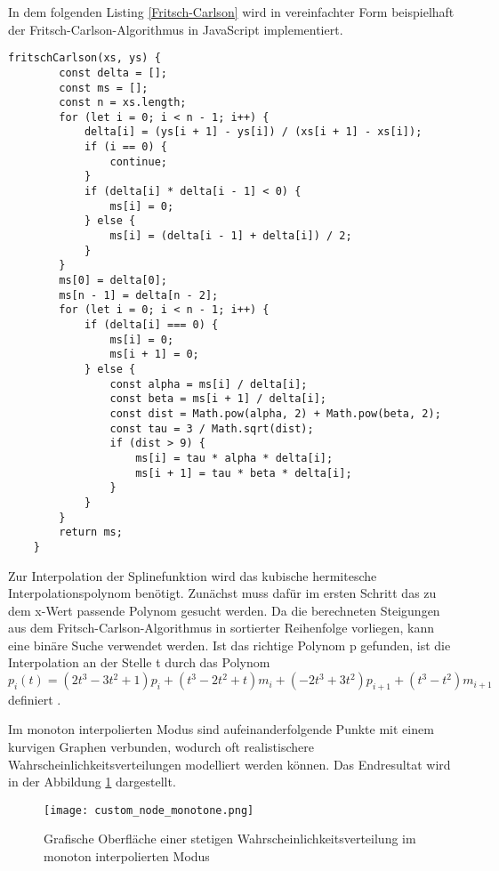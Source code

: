 In dem folgenden Listing \ref{Fritsch-Carlson} wird in vereinfachter Form beispielhaft der Fritsch-Carlson-Algorithmus in JavaScript implementiert.
\begin{lstlisting}[caption=Fritsch-Carlson Methode,label=Fritsch-Carlson]
    fritschCarlson(xs, ys) {
        const delta = [];
        const ms = [];
        const n = xs.length;
        for (let i = 0; i < n - 1; i++) {
            delta[i] = (ys[i + 1] - ys[i]) / (xs[i + 1] - xs[i]);
            if (i == 0) {
                continue;
            }
            if (delta[i] * delta[i - 1] < 0) {
                ms[i] = 0;
            } else {
                ms[i] = (delta[i - 1] + delta[i]) / 2;
            }
        }
        ms[0] = delta[0];
        ms[n - 1] = delta[n - 2];
        for (let i = 0; i < n - 1; i++) {
            if (delta[i] === 0) {
                ms[i] = 0;
                ms[i + 1] = 0;
            } else {
                const alpha = ms[i] / delta[i];
                const beta = ms[i + 1] / delta[i];
                const dist = Math.pow(alpha, 2) + Math.pow(beta, 2);
                const tau = 3 / Math.sqrt(dist);
                if (dist > 9) {
                    ms[i] = tau * alpha * delta[i];
                    ms[i + 1] = tau * beta * delta[i];
                }
            }
        }
        return ms;
    }
\end{lstlisting}

Zur Interpolation der Splinefunktion wird das kubische hermitesche Interpolationspolynom benötigt. Zunächst muss dafür im ersten Schritt das zu dem x-Wert passende Polynom gesucht werden. Da die berechneten Steigungen aus dem Fritsch-Carlson-Algorithmus in sortierter Reihenfolge vorliegen, kann eine binäre Suche verwendet werden.
Ist das richtige Polynom p gefunden, ist die Interpolation an der Stelle t durch das Polynom
$$p_i(t)=(2t^3-3t^2+1)p_i+(t^3-2t^2+t)m_i+(-2t^3+3t^2)p_{i+1}+(t^3-t^2)m_{i+1}$$
definiert \cite{Pat:2009}.

Im monoton interpolierten Modus sind aufeinanderfolgende Punkte mit einem kurvigen Graphen verbunden, wodurch oft realistischere Wahrscheinlichkeitsverteilungen modelliert werden können. Das Endresultat wird in der Abbildung \ref{fig:customnodemonotone} dargestellt.

\begin{figure}[H]
    \centering
    \texttt{[image: custom\_node\_monotone.png]}
    \caption{Grafische Oberfläche einer stetigen Wahrscheinlichkeitsverteilung im monoton interpolierten Modus}\label{fig:customnodemonotone}
\end{figure}

